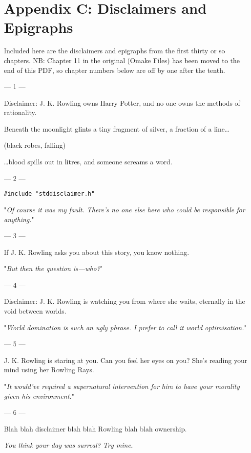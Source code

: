 \chapter{Appendix C: Disclaimers and Epigraphs}

Included here are the disclaimers and epigraphs from the first thirty or so
chapters. NB: Chapter 11 in the original (Omake Files) has been moved to
the end of this PDF, so chapter numbers below are off by one after the tenth.
\sbreak
{ %
\setlength{\parindent}{0pt}
\setlength{\parskip}{1em}

--- 1 ---

Disclaimer: J. K. Rowling owns Harry Potter, and no one owns the methods of rationality.

\begin{em}
Beneath the moonlight glints a tiny fragment of silver, a fraction of a line{\ldots}

(black robes, falling)

{\ldots}blood spills out in litres, and someone screams a word.
\end{em}

--- 2 ---

\texttt{\#include "stddisclaimer.h"}

"\emph{Of course it was my fault. There's no one else here who could be 
responsible for anything.}"

--- 3 ---

If J. K. Rowling asks you about this story, you know nothing.

"\emph{But then the question is---who?}"

--- 4 ---

Disclaimer: J. K.
Rowling is watching you from where she waits, eternally in the void between
worlds.

"\emph{World domination is such an ugly phrase. I prefer to call it world
optimisation.}"

--- 5 ---

J. K. Rowling is
staring at you. Can you feel her eyes on you? She's reading your mind using her
Rowling Rays.

"\emph{It would've required a \emph{supernatural intervention} for him to have
\emph{your} morality given \emph{his} environment.}"

--- 6 ---

Blah blah
disclaimer blah blah Rowling blah blah ownership.

\emph{You think your day was surreal? Try mine.}

}
